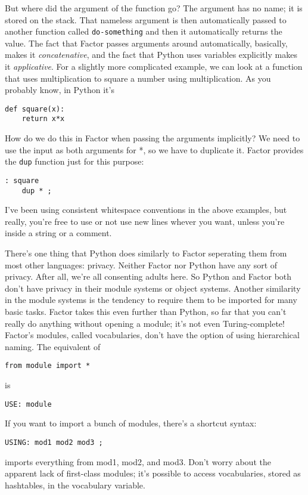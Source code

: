 \documentclass{article}
\begin{document}
But where did the argument of the function go? The argument has no name; it is stored on the stack. That nameless argument is then automatically passed to another function called \texttt{do-something} and then it automatically returns the value. The fact that Factor passes arguments around automatically, basically, makes it \emph{concatenative}, and the fact that Python uses variables explicitly makes it \emph{applicative}. For a slightly more complicated example, we can look at a function that uses multiplication to square a number using multiplication. As you probably know, in Python it's
\begin{verbatim}
def square(x):
    return x*x
\end{verbatim}
How do we do this in Factor when passing the arguments implicitly? We need to use the input as both arguments for *, so we have to duplicate it. Factor provides the \texttt{dup} function just for this purpose:
\begin{verbatim}
: square
    dup * ;
\end{verbatim}
I've been using consistent whitespace conventions in the above examples, but really, you're free to use or not use new lines whever you want, unless you're inside a string or a comment.

There's one thing that Python does similarly to Factor seperating them from most other languages: privacy. Neither Factor nor Python have any sort of privacy. After all, we're all consenting adults here. So Python and Factor both don't have privacy in their module systems or object systems. Another similarity in the module systems is the tendency to require them to be imported for many basic tasks. Factor takes this even further than Python, so far that you can't really do anything without opening a module; it's not even Turing-complete! Factor's modules, called vocabularies, don't have the option of using hierarchical naming. The equivalent of
\begin{verbatim}
from module import *
\end{verbatim}
is
\begin{verbatim}
USE: module
\end{verbatim}
If you want to import a bunch of modules, there's a shortcut syntax:
\begin{verbatim}
USING: mod1 mod2 mod3 ;
\end{verbatim}
imports everything from mod1, mod2, and mod3. Don't worry about the apparent lack of first-class modules; it's possible to access vocabularies, stored as hashtables, in the vocabulary variable.
\end{document}
